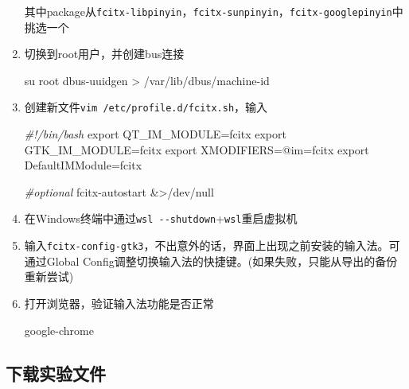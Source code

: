 \documentclass[
]{article}
\newenvironment{Shaded}{}{}
\newcommand{\BuiltInTok}[1]{\textcolor[rgb]{0.00,0.50,0.00}{#1}}
\newcommand{\CommentTok}[1]{\textcolor[rgb]{0.38,0.63,0.69}{\textit{#1}}}
\newcommand{\ExtensionTok}[1]{#1}
\newcommand{\FunctionTok}[1]{\textcolor[rgb]{0.02,0.16,0.49}{#1}}
\newcommand{\NormalTok}[1]{#1}
\newcommand{\OperatorTok}[1]{\textcolor[rgb]{0.40,0.40,0.40}{#1}}
\newcommand{\VariableTok}[1]{\textcolor[rgb]{0.10,0.09,0.49}{#1}}
\begin{document}
\begin{enumerate}
        其中package从\texttt{fcitx-libpinyin}，\texttt{fcitx-sunpinyin}，\texttt{fcitx-googlepinyin}中挑选一个
  \item
        切换到root用户，并创建bus连接

        \begin{Shaded}
          \begin{Highlighting}[]
            \FunctionTok{su}\NormalTok{ root}
            \ExtensionTok{dbus{-}uuidgen} \OperatorTok{\textgreater{}}\NormalTok{ /var/lib/dbus/machine{-}id}
          \end{Highlighting}
        \end{Shaded}
  \item
        创建新文件\texttt{vim\ /etc/profile.d/fcitx.sh}，输入

        \begin{Shaded}
          \begin{Highlighting}[]
            \CommentTok{\#!/bin/bash}
            \BuiltInTok{export} \VariableTok{QT\_IM\_MODULE}\OperatorTok{=}\NormalTok{fcitx}
            \BuiltInTok{export} \VariableTok{GTK\_IM\_MODULE}\OperatorTok{=}\NormalTok{fcitx}
            \BuiltInTok{export} \VariableTok{XMODIFIERS}\OperatorTok{=}\NormalTok{@im=fcitx}
            \BuiltInTok{export} \VariableTok{DefaultIMModule}\OperatorTok{=}\NormalTok{fcitx}

            \CommentTok{\#optional}
            \ExtensionTok{fcitx{-}autostart} \OperatorTok{\&\textgreater{}}\NormalTok{/dev/null}
          \end{Highlighting}
        \end{Shaded}
  \item
        在Windows终端中通过\texttt{wsl\ -\/-shutdown}+\texttt{wsl}重启虚拟机
  \item
        输入\texttt{fcitx-config-gtk3}，不出意外的话，界面上出现之前安装的输入法。可通过Global
        Config调整切换输入法的快捷键。(如果失败，只能从导出的备份重新尝试)
  \item
        打开浏览器，验证输入法功能是否正常

        \begin{Shaded}
          \begin{Highlighting}[]
            \NormalTok{google{-}chrome}
          \end{Highlighting}
        \end{Shaded}
\end{enumerate}

\subsection{下载实验文件}\label{ux4e0bux8f7dux5b9eux9a8cux6587ux4ef6}
\end{document}
